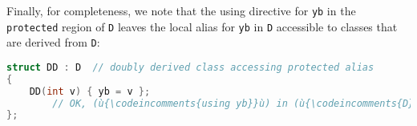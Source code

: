 \noindent Finally, for completeness, we note that the using directive for
\texttt{yb} in the \texttt{protected} region of \texttt{D} leaves the
local alias for \texttt{yb} in \texttt{D} accessible to classes that are
derived from \texttt{D}:

\begin{lstlisting}[language=C++]
struct DD : D  // doubly derived class accessing protected alias
{
    DD(int v) { yb = v };
        // OK, (ù{\codeincomments{using yb}}ù) in (ù{\codeincomments{D}}ù) exposes (ù{\codeincomments{protected}}ù) alias; assigns (17).
};
\end{lstlisting}




